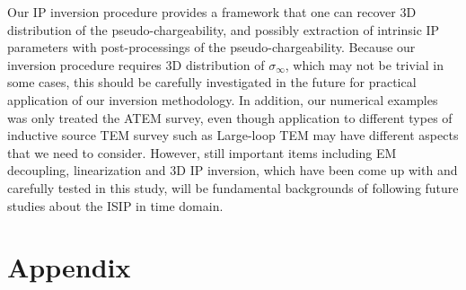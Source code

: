 \documentclass[a4paper, 11pt]{article}
\newcommand{\siginf}{\sigma_\infty}
\begin{document}
Our IP inversion procedure provides a framework that one can recover 3D distribution of the pseudo-chargeability, and possibly extraction of intrinsic IP parameters with post-processings of the pseudo-chargeability. 
Because our inversion procedure requires 3D distribution of $\siginf$, which may not be trivial in some cases, this should be carefully investigated in the future for practical application of our inversion methodology. 
In addition, our numerical examples was only treated the ATEM survey, even though application to different types of inductive source TEM survey such as Large-loop TEM may have different aspects that we need to consider. 
However, still important items including EM decoupling, linearization and 3D IP inversion, which have been come up with and carefully tested in this study, will be fundamental backgrounds of following future studies about the ISIP in time domain. 


\section{Appendix}
\end{document}
